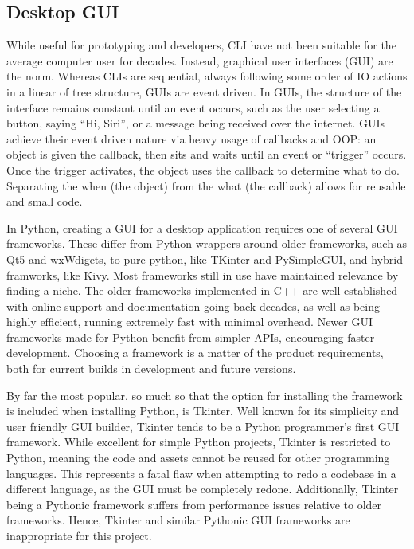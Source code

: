 \documentclass[11pt]{article}
\begin{document}
\inputminted[]{shell}{cli_examples/simple_cli.txt}

\subsection{Desktop GUI}

While useful for prototyping and developers, CLI have not been suitable for the average computer user for decades. Instead, graphical user interfaces (GUI) are the norm. Whereas CLIs are sequential, always following some order of IO actions in a linear of tree structure, GUIs are event driven. In GUIs, the structure of the interface remains constant until an event occurs, such as the user selecting a button, saying ``Hi, Siri'', or a message being received over the internet. GUIs achieve their event driven nature via heavy usage of callbacks and OOP: an object is given the callback, then sits and waits until an event or ``trigger'' occurs. Once the trigger activates, the object uses the callback to determine what to do.  Separating the when (the object) from the what (the callback) allows for reusable and small code.

In Python, creating a GUI for a desktop application requires one of several GUI frameworks. These differ from Python wrappers around older frameworks, such as Qt5 and wxWdigets, to pure python, like TKinter and PySimpleGUI, and hybrid framworks, like Kivy. Most frameworks still in use have maintained relevance by finding a niche. The older frameworks implemented in C++ are well-established with online support and documentation going back decades, as well as being highly efficient, running extremely fast with minimal overhead. Newer GUI frameworks made for Python benefit from simpler APIs, encouraging faster development. Choosing a framework is a matter of the product requirements, both for current builds in development and future versions.

By far the most popular, so much so that the option for installing the framework is included when installing Python, is Tkinter. Well known for its simplicity and user friendly GUI builder, Tkinter tends to be a Python programmer's first GUI framework. While excellent for simple Python projects, Tkinter is restricted to Python, meaning the code and assets cannot be reused for other programming languages. This represents a fatal flaw when attempting to redo a codebase in a different language, as the GUI must be completely redone. Additionally, Tkinter being a Pythonic framework suffers from performance issues relative to older frameworks. Hence, Tkinter and similar Pythonic GUI frameworks are inappropriate for this project.
\end{document}
